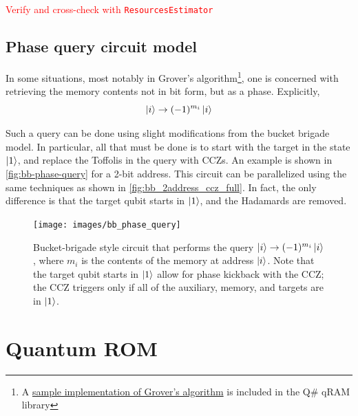 \documentclass[a4paper,12pt]{article}
\newcommand\todo[1]{\textcolor{red}{#1}}
\begin{document}
\todo{Verify and cross-check with \texttt{ResourcesEstimator}}


\subsection{Phase query circuit model}

In some situations, most notably in Grover's algorithm\footnote{A \href{https://github.com/qsharp-community/qram/tree/master/samples/Grover}{sample implementation of Grover's algorithm} is included in the Q\# qRAM library}, one is concerned with retrieving the memory contents not in bit form, but as a phase. 
Explicitly, 
\begin{equation}
 \ket{i} \rightarrow (-1)^{m_i} \ket{i}
\end{equation}

Such a query can be done using slight modifications from the bucket brigade model.
In particular, all that must be done is to start with the target in the state $\ket{1}$, and replace the Toffolis in the query with CCZs.
An example is shown in \autoref{fig:bb-phase-query} for a 2-bit address. 
This circuit can be parallelized using the same techniques as shown in \autoref{fig:bb_2address_ccz_full}.
In fact, the only difference is that the target qubit starts in $\ket{1}$, and the Hadamards are removed.

\begin{figure}[ht!]
 \centering
  \captionsetup{width=.89\linewidth}
 \texttt{[image: images/bb\_phase\_query]}
 \caption{Bucket-brigade style circuit that performs the query $\ket{i} \rightarrow (-1)^{m_i}\ket{i}$, where $m_i$ is  the contents of the memory at address $\ket{i}$.
 Note that the target qubit starts in $\ket{1}$ allow for phase kickback with the CCZ; the CCZ triggers only if all of the auxiliary, memory, and targets are in $\ket{1}$.}
 \label{fig:bb-phase-query}
\end{figure}


\section{Quantum ROM}
\label{sec:qrom}
\end{document}
